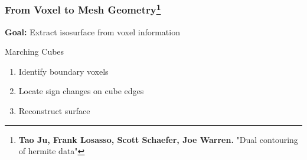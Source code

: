 


\begin{frame}
\frametitle{From Voxel to Mesh Geometry\footnote{\textbf{Tao Ju, Frank Losasso, Scott Schaefer, Joe Warren.} "Dual contouring of hermite data"}}
\vspace{-0.3cm}
\begin{center}
	\textbf{Goal:} Extract isosurface from voxel information	
\end{center}
\vspace{-0.5cm}	
\begin{minipage}[t]{0.4\linewidth}
	\begin{block}{Marching Cubes}
		\begin{enumerate}
			\item<2-> Identify boundary voxels
			\item<3-> Locate sign changes on cube edges
			\item<4-> Reconstruct surface
		\end{enumerate}
	\end{block}
\end{minipage}
\end{frame}
